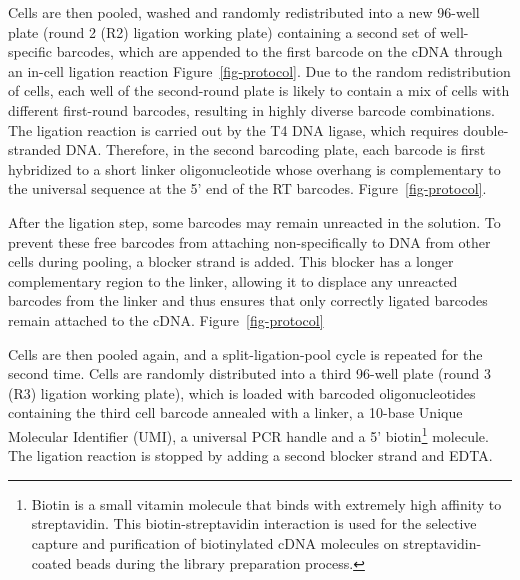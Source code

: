 \documentclass[
  11pt,
  a4paper,
]{report}
\begin{document}
Cells are then pooled, washed and randomly redistributed into a new
96-well plate (round 2 (R2) ligation working plate) containing a second
set of well-specific barcodes, which are appended to the first barcode
on the cDNA through an in-cell ligation reaction
Figure~\ref{fig-protocol}. Due to the random redistribution of cells,
each well of the second-round plate is likely to contain a mix of cells
with different first-round barcodes, resulting in highly diverse barcode
combinations. The ligation reaction is carried out by the T4 DNA ligase,
which requires double-stranded DNA. Therefore, in the second barcoding
plate, each barcode is first hybridized to a short linker
oligonucleotide whose overhang is complementary to the universal
sequence at the 5' end of the RT barcodes. Figure~\ref{fig-protocol}.

\begin{tcolorbox}[enhanced jigsaw, colbacktitle=quarto-callout-note-color!10!white, bottomtitle=1mm, coltitle=black, colframe=quarto-callout-note-color-frame, left=2mm, bottomrule=.15mm, rightrule=.15mm, opacityback=0, toptitle=1mm, colback=white, title=\textcolor{quarto-callout-note-color}{\faInfo}\hspace{0.5em}{Note}, arc=.35mm, toprule=.15mm, breakable, leftrule=.75mm, opacitybacktitle=0.6, titlerule=0mm]

After the ligation step, some barcodes may remain unreacted in the
solution. To prevent these free barcodes from attaching non-specifically
to DNA from other cells during pooling, a blocker strand is added. This
blocker has a longer complementary region to the linker, allowing it to
displace any unreacted barcodes from the linker and thus ensures that
only correctly ligated barcodes remain attached to the cDNA.
Figure~\ref{fig-protocol}

\end{tcolorbox}

Cells are then pooled again, and a split-ligation-pool cycle is repeated
for the second time. Cells are randomly distributed into a third 96-well
plate (round 3 (R3) ligation working plate), which is loaded with
barcoded oligonucleotides containing the third cell barcode annealed
with a linker, a 10-base Unique Molecular Identifier (UMI), a universal
PCR handle and a 5' biotin\footnote{Biotin is a small vitamin molecule
  that binds with extremely high affinity to streptavidin. This
  biotin-streptavidin interaction is used for the selective capture and
  purification of biotinylated cDNA molecules on streptavidin-coated
  beads during the library preparation process.} molecule. The ligation
reaction is stopped by adding a second blocker strand and EDTA.
\end{document}
